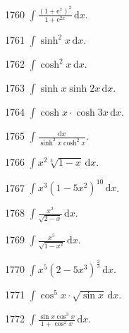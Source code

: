 \begin{prob}[S]{1760}
$\int \frac{(1 + \mathrm{e}^x)^2}{1 + \mathrm{e}^{2x}}\,\mathrm{d}x$.
\end{prob}

\begin{prob}[S]{1761}
$\int \sinh^2 x\,\mathrm{d}x$.
\end{prob}

\begin{prob}[S]{1762}
$\int \cosh^2 x\,\mathrm{d}x$.
\end{prob}

\begin{prob}[S]{1763}
$\int \sinh x \sinh 2x\,\mathrm{d}x$.
\end{prob}

\begin{prob}[S]{1764}
$\int \cosh x \cdot \cosh 3x\,\mathrm{d}x$.
\end{prob}

\begin{prob}[S]{1765}
$\int \frac{\mathrm{d}x}{\sinh^2 x \cosh^2 x}$.
\end{prob}


\begin{prob}[S]{1766}
$\int x^2 \sqrt[3]{1 - x}\,\mathrm{d}x$.
\end{prob}

\begin{prob}[S]{1767}
$\int x^3 (1 - 5x^2)^{10}\,\mathrm{d}x$.
\end{prob}

\begin{prob}[S]{1768}
$\int \frac{x^2}{\sqrt{2 - x}}\,\mathrm{d}x$.
\end{prob}

\begin{prob}[S]{1769}
$\int \frac{x^5}{\sqrt{1 - x^2}}\,\mathrm{d}x$.
\end{prob}

\begin{prob}[S]{1770}
$\int x^5 (2 - 5x^3)^{\frac{2}{3}}\,\mathrm{d}x$.
\end{prob}

\begin{prob}[S]{1771}
$\int \cos^5 x \cdot \sqrt{\sin x}\,\mathrm{d}x$.
\end{prob}

\begin{prob}[S]{1772}
$\int \frac{\sin x \cos^3 x}{1 + \cos^2 x}\,\mathrm{d}x$.
\end{prob}

